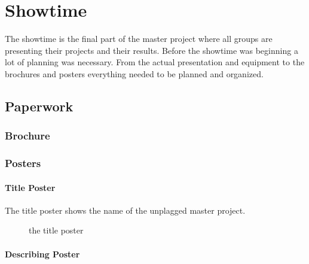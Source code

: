 \chapter{Showtime}\label{chap:Showtime}

The showtime is the final part of the master project where all groups are presenting their projects and their results.
Before the showtime was beginning a lot of planning was necessary. From the actual presentation and equipment to the brochures and posters everything needed to be planned and organized.

\section{Paperwork}

\subsection{Brochure}

\subsection{Posters}

\subsubsection{Title Poster}
The title poster shows the name of the unplagged master project.

\begin{figure}[!h]
  \centering
  \caption{the title poster}
  \label{fig:poster_title}
\end{figure}

\subsubsection{Describing Poster}

